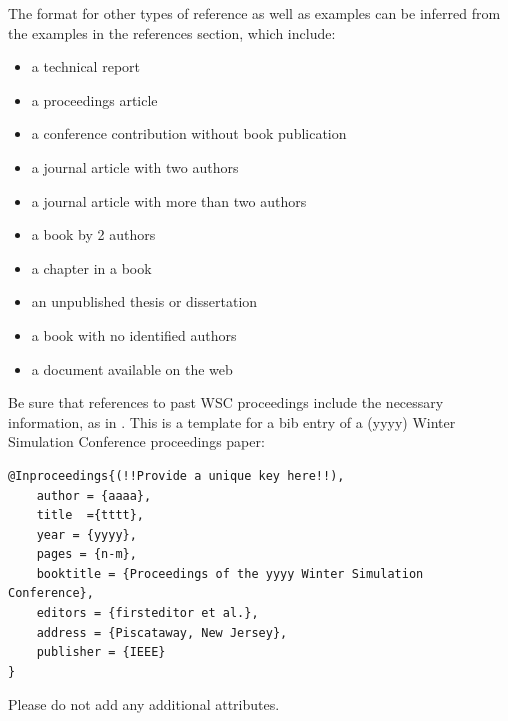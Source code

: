 \documentclass{wscpaperproc}
\theoremstyle{wsc}
\begin{document}
The format for other types of reference as well as examples can be inferred from the examples in the references section, which include:
\begin{itemize}
\item a technical report \cite{chi89}
\item a proceedings article \cite{cheng:input94}
\item a conference contribution without book publication 
\item a journal article with two authors \cite{powell2017widening}
\item a journal article with more than two authors 
\item a book by 2 authors \cite{hammersley:montecarlo}
\item a chapter in a book \cite{sch79}
\item an unpublished thesis or dissertation \cite{ste99}
\item a book with no identified authors \cite{chicago03}
\item a document available on the web \cite{WSC}
\end{itemize}

Be sure that references to past WSC proceedings include the necessary information, as in . 
This is a template for a bib entry of a (yyyy) Winter Simulation Conference proceedings paper:\newline

\begin{verbatim}
@Inproceedings{(!!Provide a unique key here!!),
	author = {aaaa},
	title  ={tttt},
	year = {yyyy},
	pages = {n-m},
	booktitle = {Proceedings of the yyyy Winter Simulation Conference},
	editors = {firsteditor et al.},
	address = {Piscataway, New Jersey},
	publisher = {IEEE}
}
\end{verbatim}\vspace{5mm}

Please do not add any additional attributes.
\end{document}
